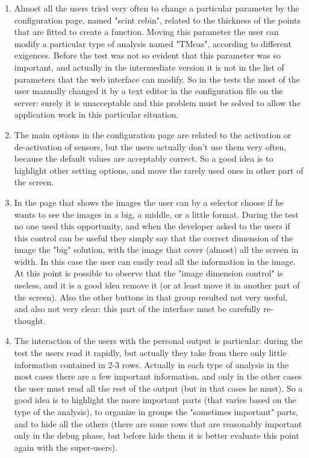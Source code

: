 \begin{enumerate}

\item
Almost all the users tried very often to change a particular parameter by the configuration page, named "scint rebin", related to the thickness of the points that are fitted to create a function. Moving this parameter the user can modify a particular type of analysis named "TMeas", according to different exigences. Before the test was not so evident that this parameter was so important, and actually in the intermediate version it is not in the list of parameters that the web interface can modify. So in the tests the most of the user manually changed it by a text editor in the configuration file on the server: surely it is unacceptable and this problem must be solved to allow the application work in this particular situation.

\item 
The main options in the configuration page are related to the activation or de-activation of sensors, but the users actually don't use them very often, because  the default values are acceptably correct. So a good idea is to highlight other setting options, and move the rarely used ones in other part of the screen.

\item
In the page that shows the images the user can by a selector choose if he wants to see the images in a big, a middle, or a little format. During the test no one used this opportunity, and when the developer asked to the users if this control can be useful they simply say that the correct dimension of the image the "big" solution, with the image that cover (almost) all the screen in width. In this case the user can easily read all the information in the image. At this point is possible to observe that the "image dimension control" is useless, and it is a good idea remove it (or at least move it in another part of the screen). Also the other buttons in that group resulted not very useful, and also not very clear: this part of the interface must be carefully re-thought.   


\item
The interaction of the users with the personal output is particular: during the test the users read it rapidly, but actually they take from there only little information contained in 2-3 rows. Actually in each type of analysis in the most cases there are a few important information, and only in the other cases the user must read all the rest of the output (but in that cases he must). So a good idea is to highlight the more important parts (that varies based on the type of the analysis), to organize in groups the "sometimes important" parts, and to hide all the others (there are some rows that are reasonably important only in the debug phase, but before hide them it is better evaluate this point again with the super-users).


\end{enumerate}
